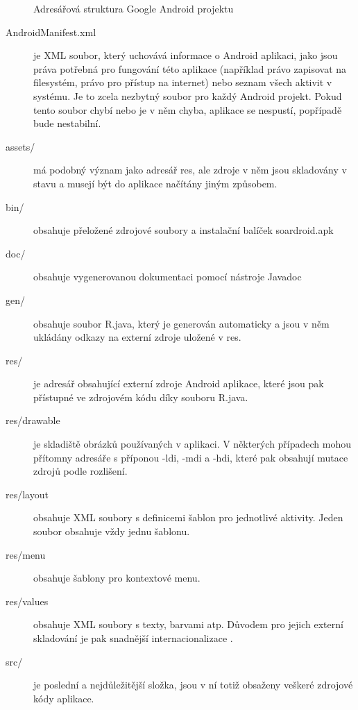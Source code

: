 \documentclass[thesis=M,czech]{FITthesis}[2012/06/26]
\begin{document}
\begin{figure}
\caption{Adresářová struktura Google Android projektu}
\label{fig:android_project_structure}
\end{figure}

\begin{description}
\item[AndroidManifest.xml] je XML soubor, který uchovává informace o Android aplikaci, jako jsou práva potřebná pro fungování této aplikace (například právo zapisovat na filesystém, právo pro přístup na internet) nebo seznam všech aktivit v systému. Je to zcela nezbytný soubor pro každý Android projekt. Pokud tento soubor chybí nebo je v něm chyba, aplikace se nespustí, popřípadě bude nestabilní.
\item[assets/] má podobný význam jako adresář res, ale zdroje v něm jsou skladovány v  stavu a musejí být do aplikace načítány jiným způsobem.
\item[bin/] obsahuje přeložené zdrojové soubory a instalační balíček soardroid.apk
\item[doc/] obsahuje vygenerovanou dokumentaci pomocí nástroje Javadoc
\item[gen/] obsahuje soubor R.java, který je generován automaticky a jsou v něm ukládány odkazy na externí zdroje uložené v res.
\item[res/] je adresář obsahující externí zdroje Android aplikace, které jsou pak přístupné ve zdrojovém kódu díky souboru R.java.
\item[res/drawable] je skladiště obrázků používaných v aplikaci. V některých případech mohou přítomny adresáře s příponou -ldi, -mdi a -hdi, které pak obsahují mutace zdrojů podle rozlišení.
\item[res/layout] obsahuje XML soubory s definicemi šablon pro jednotlivé aktivity. Jeden soubor obsahuje vždy jednu šablonu.
\item[res/menu] obsahuje šablony pro kontextové menu.
\item[res/values] obsahuje XML soubory s texty, barvami atp. Důvodem pro jejich externí skladování je pak snadnější internacionalizace \cite{android_i18n}.
\item[src/] je poslední a nejdůležitější složka, jsou v ní totiž obsaženy veškeré zdrojové kódy aplikace.

\end{description}
\end{document}
